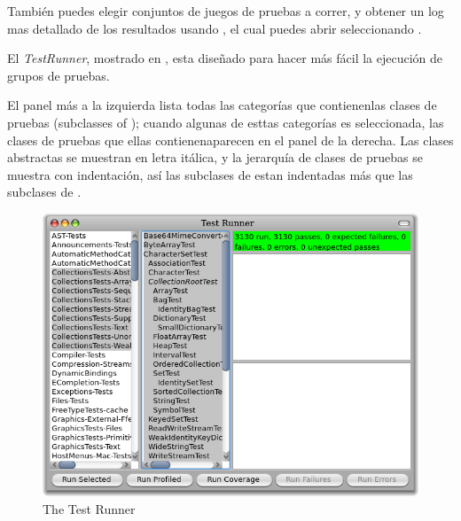 \documentclass[a4paper,10pt,twoside]{book}
\begin{document}
Tambi\'en puedes elegir conjuntos de juegos de pruebas a correr, y obtener un log mas detallado de los resultados
usando \sunit {}, el cual puedes abrir seleccionando .


El \emph{TestRunner}, mostrado en , esta dise\~nado para hacer m\'as
f\'acil la ejecuci\'on de grupos de pruebas.

El panel m\'as a la izquierda lista todas las categor\'ias que contienenlas clases de pruebas
(\ie  subclasses of ); cuando algunas de esttas categor\'ias es seleccionada, las clases de pruebas
que ellas contienenaparecen en el panel de la derecha.
Las clases abstractas se muestran en letra it\'alica, y la jerarqu\'ia de clases de pruebas se muestra con indentaci\'on,
as\'i las subclases de  estan indentadas m\'as que las subclases de .


\begin{figure}[tbh]
  \begin{center}
	\includegraphics[width=\linewidth]{test-runner}
	\caption{The \pharo \sunit Test Runner}
  \end{center}
\end{figure}


\end{document}
